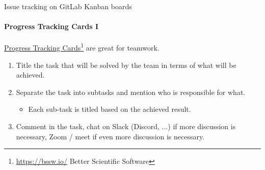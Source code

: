 \begin{frame}{Issue tracking on GitLab Kanban boards} 
    \framesubtitle{Progress Tracking Cards I}
    \vfill

    \href{}{Progress Tracking Cards}\footnote{\href{https://bssw.io/}{https://bssw.io/} Better Scientific Software} are great for teamwork.
    \begin{enumerate}  
        \item Title the task that will be solved by the team in terms of what will be achieved.
        \item Separate the task into subtasks and mention who is responsible for what. 
            \begin{itemize}
                \item Each sub-task is titled based on the achieved result.
            \end{itemize}
        \item Comment in the task, chat on Slack (Discord, ...) if more discussion is necessary, Zoom / meet if even more discussion is necessary.
    \end{enumerate}

\end{frame}

